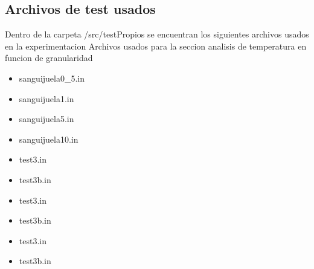 
\subsection{Archivos de test usados}
Dentro de la carpeta /src/testPropios se encuentran los siguientes archivos usados en la experimentacion
Archivos usados para la seccion analisis de temperatura en funcion de granularidad
\begin{itemize}
 \item sanguijuela0\_5.in
 \item sanguijuela1.in
 \item sanguijuela5.in
 \item sanguijuela10.in 
 \item test3.in
 \item test3b.in
 \item test3.in
 \item test3b.in
 \item test3.in
 \item test3b.in
\end{itemize}




